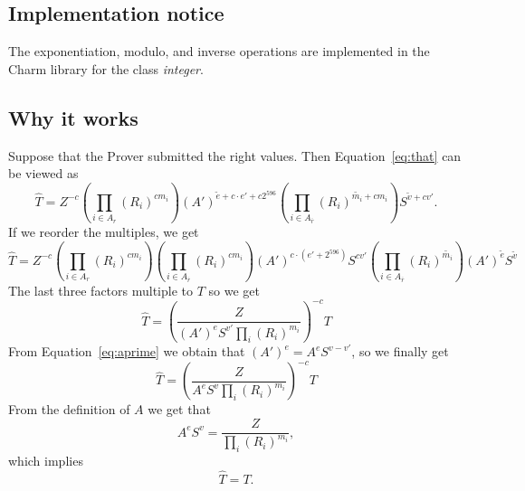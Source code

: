 \documentclass[a4paper]{article}
\begin{document}
\subsection{Implementation notice}
The exponentiation, modulo, and inverse operations are implemented in the Charm library for the class \textsl{integer}.

\subsection{Why it works}

Suppose that the Prover submitted the right values. Then Equation~\eqref{eq:that} can be viewed as
\begin{equation}
\widehat{T} = Z^{-c}\left(\prod_{i \in A_r}(R_i)^{cm_i}\right)
(A')^{ \widetilde{e}+c\cdot e'+c2^{596}} \left(\prod_{i\in A_{\overline{r}}}(R_i)^{ \widetilde{m_i} + cm_i}\right)
S^{\widetilde{v}+cv'}.
\end{equation}
If we reorder the multiples, we get
\begin{equation}
\widehat{T} = Z^{-c}\left(\prod_{i \in A_r}(R_i)^{cm_i}\right)\left(\prod_{i\in A_{\overline{r}}}(R_i)^{ cm_i}\right)
(A')^{ c\cdot (e'+2^{596})}
S^{cv'}
\left(\prod_{i\in A_{\overline{r}}}(R_i)^{ \widetilde{m_i}}\right)(A')^{ \widetilde{e}}
S^{\widetilde{v}}
\end{equation}
The last three factors multiple to $T$ so we get
\begin{equation}
\widehat{T} =\left(\frac{Z}{(A')^{e}S^{v'}\prod_i (R_i)^{m_i}}\right)^{-c}T
\end{equation}
From Equation~\eqref{eq:aprime} we obtain that
$(A')^e =A^e S^{v-v'}$, so we finally get
\begin{equation}
\widehat{T} =\left(\frac{Z}{A^{e}S^{v}\prod_i (R_i)^{m_i}}\right)^{-c}T
\end{equation} 
From the definition of $A$ we get that
\begin{equation}
A^e S^v = \frac{Z}{\prod_i (R_i)^{m_i}},
\end{equation}
which implies
$$
\widehat{T} = T.
$$
\end{document}
